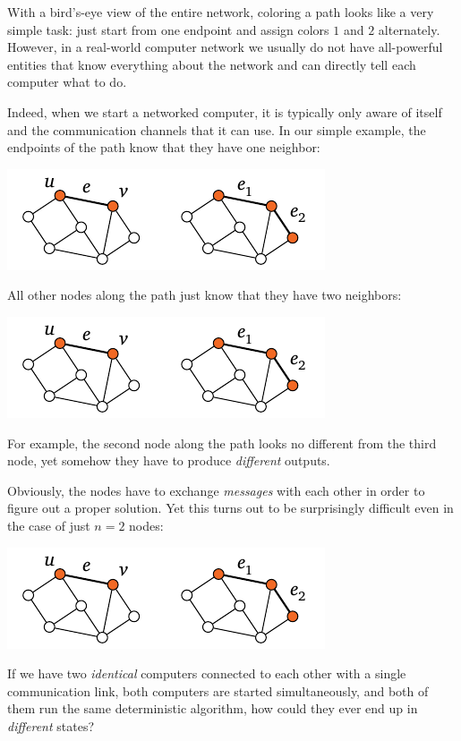 With a bird's-eye view of the entire network, coloring a path looks like a very simple task: just start from one endpoint and assign colors $1$ and $2$ alternately. However, in a real-world computer network we usually do not have all-powerful entities that know everything about the network and can directly tell each computer what to do.

Indeed, when we start a networked computer, it is typically only aware of itself and the communication channels that it can use. In our simple example, the endpoints of the path know that they have one neighbor:
\begin{center}
    \includegraphics[page=\PIntroDegOne]{figs.pdf}
\end{center}
All other nodes along the path just know that they have two neighbors:
\begin{center}
    \includegraphics[page=\PIntroDegTwo]{figs.pdf}
\end{center}
For example, the second node along the path looks no different from the third node, yet somehow they have to produce \emph{different} outputs.

Obviously, the nodes have to exchange \emph{messages} with each other in order to figure out a proper solution. Yet this turns out to be surprisingly difficult even in the case of just $n = 2$ nodes:
\begin{center}
    \includegraphics[page=\PIntroTwo]{figs.pdf}
\end{center}
If we have two \emph{identical} computers connected to each other with a single communication link, both computers are started simultaneously, and both of them run the same deterministic algorithm, how could they ever end up in \emph{different} states?

